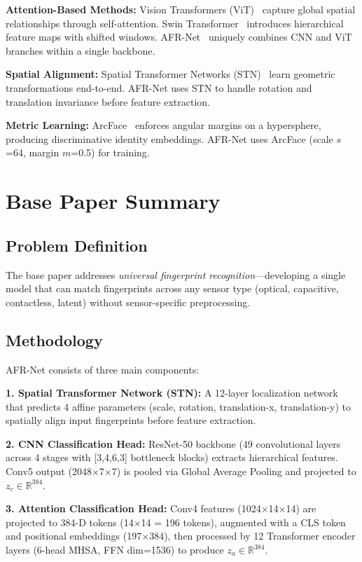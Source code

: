 \documentclass[conference]{IEEEtran}
\begin{document}
\textbf{Attention-Based Methods:} Vision Transformers (ViT)~\cite{dosovitskiy2020image} capture global spatial relationships through self-attention. Swin Transformer~\cite{liu2021swin} introduces hierarchical feature maps with shifted windows. AFR-Net~\cite{afrnet} uniquely combines CNN and ViT branches within a single backbone.

\textbf{Spatial Alignment:} Spatial Transformer Networks (STN)~\cite{jaderberg2015spatial} learn geometric transformations end-to-end. AFR-Net uses STN to handle rotation and translation invariance before feature extraction.

\textbf{Metric Learning:} ArcFace~\cite{deng2019arcface} enforces angular margins on a hypersphere, producing discriminative identity embeddings. AFR-Net uses ArcFace (scale $s$=64, margin $m$=0.5) for training.

\section{Base Paper Summary}

\subsection{Problem Definition}
The base paper addresses \textit{universal fingerprint recognition}---developing a single model that can match fingerprints across any sensor type (optical, capacitive, contactless, latent) without sensor-specific preprocessing.

\subsection{Methodology}

AFR-Net consists of three main components:

\textbf{1. Spatial Transformer Network (STN):} A 12-layer localization network that predicts 4 affine parameters (scale, rotation, translation-x, translation-y) to spatially align input fingerprints before feature extraction.

\textbf{2. CNN Classification Head:} ResNet-50 backbone (49 convolutional layers across 4 stages with [3,4,6,3] bottleneck blocks) extracts hierarchical features. Conv5 output (2048$\times$7$\times$7) is pooled via Global Average Pooling and projected to $z_c \in \mathbb{R}^{384}$.

\textbf{3. Attention Classification Head:} Conv4 features (1024$\times$14$\times$14) are projected to 384-D tokens (14$\times$14 = 196 tokens), augmented with a CLS token and positional embeddings (197$\times$384), then processed by 12 Transformer encoder layers (6-head MHSA, FFN dim=1536) to produce $z_a \in \mathbb{R}^{384}$.
\end{document}
